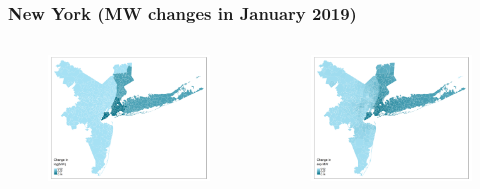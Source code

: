 \documentclass[aspectratio=169, t]{beamer}
\begin{document}
\begin{frame}[label = nyc_example]
\frametitle{New York (MW changes in January 2019)}
    \begin{columns}
        \begin{column}{0.50\textwidth}
            \vspace{-4mm}
            \begin{figure}
                \centering
                \includegraphics[scale = 0.36]{maps_events/output/nyc_2018-12_actual_mw.png}
            \end{figure}   
        \end{column}
        \begin{column}{0.50\textwidth}
            \vspace{-4mm}
            \begin{figure}
                \centering
                \includegraphics[scale = 0.36]{maps_events/output/nyc2018-12_exp_mw.png}
            \end{figure}   
        \end{column}
    \end{columns}
    \hyperlink{chi_example}{}
\end{frame}
\end{document}
